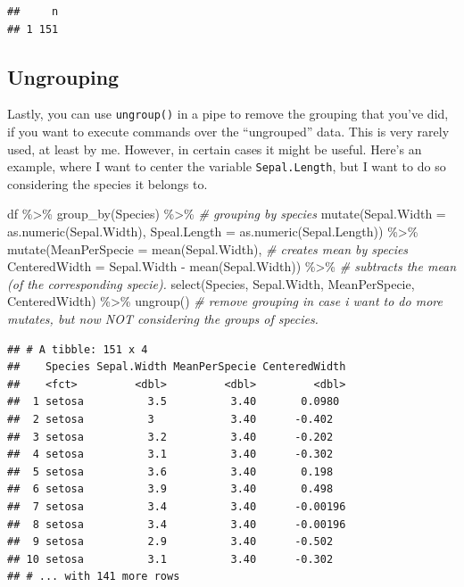 \documentclass[
]{book}
\newenvironment{Shaded}{\begin{snugshade}}{\end{snugshade}}
\newcommand{\AttributeTok}[1]{\textcolor[rgb]{0.77,0.63,0.00}{#1}}
\newcommand{\CommentTok}[1]{\textcolor[rgb]{0.56,0.35,0.01}{\textit{#1}}}
\newcommand{\FunctionTok}[1]{\textcolor[rgb]{0.00,0.00,0.00}{#1}}
\newcommand{\NormalTok}[1]{#1}
\newcommand{\SpecialCharTok}[1]{\textcolor[rgb]{0.00,0.00,0.00}{#1}}
\begin{document}
\begin{verbatim}
##     n
## 1 151
\end{verbatim}

\hypertarget{ungrouping}{%
\subsection{Ungrouping}\label{ungrouping}}

Lastly, you can use \texttt{ungroup()} in a pipe to remove the grouping that you've did, if you want to execute commands over the ``ungrouped'' data.
This is very rarely used, at least by me.
However, in certain cases it might be useful.
Here's an example, where I want to center the variable \texttt{Sepal.Length}, but I want to do so considering the species it belongs to.

\begin{Shaded}
\begin{Highlighting}[]
\NormalTok{df }\SpecialCharTok{\%\textgreater{}\%} 
  \FunctionTok{group\_by}\NormalTok{(Species) }\SpecialCharTok{\%\textgreater{}\%}  \CommentTok{\# grouping by species}
  \FunctionTok{mutate}\NormalTok{(}\AttributeTok{Sepal.Width =} \FunctionTok{as.numeric}\NormalTok{(Sepal.Width),}
         \AttributeTok{Speal.Length =} \FunctionTok{as.numeric}\NormalTok{(Sepal.Length)) }\SpecialCharTok{\%\textgreater{}\%} 
  \FunctionTok{mutate}\NormalTok{(}\AttributeTok{MeanPerSpecie =} \FunctionTok{mean}\NormalTok{(Sepal.Width),  }\CommentTok{\# creates mean by species}
         \AttributeTok{CenteredWidth =}\NormalTok{ Sepal.Width }\SpecialCharTok{{-}} \FunctionTok{mean}\NormalTok{(Sepal.Width)) }\SpecialCharTok{\%\textgreater{}\%}   \CommentTok{\# subtracts the mean (of the corresponding specie).}
  \FunctionTok{select}\NormalTok{(Species, Sepal.Width, MeanPerSpecie, CenteredWidth) }\SpecialCharTok{\%\textgreater{}\%} 
  \FunctionTok{ungroup}\NormalTok{() }\CommentTok{\# remove grouping in case i want to do more mutates, but now NOT considering the groups of species.}
\end{Highlighting}
\end{Shaded}

\begin{verbatim}
## # A tibble: 151 x 4
##    Species Sepal.Width MeanPerSpecie CenteredWidth
##    <fct>         <dbl>         <dbl>         <dbl>
##  1 setosa          3.5          3.40       0.0980 
##  2 setosa          3            3.40      -0.402  
##  3 setosa          3.2          3.40      -0.202  
##  4 setosa          3.1          3.40      -0.302  
##  5 setosa          3.6          3.40       0.198  
##  6 setosa          3.9          3.40       0.498  
##  7 setosa          3.4          3.40      -0.00196
##  8 setosa          3.4          3.40      -0.00196
##  9 setosa          2.9          3.40      -0.502  
## 10 setosa          3.1          3.40      -0.302  
## # ... with 141 more rows
\end{verbatim}
\end{document}

